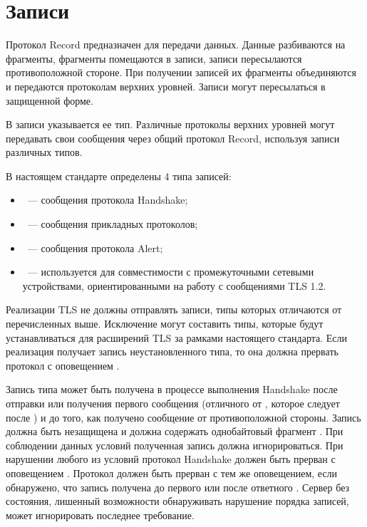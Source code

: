 \section{Записи}\label{RECORD.Rec}

Протокол Record предназначен для передачи данных. Данные разбиваются на 
фрагменты, фрагменты помещаются в записи, записи пересылаются противоположной 
стороне. При получении записей их фрагменты объединяются и передаются 
протоколам верхних уровней. Записи могут пересылаться в защищенной форме.

В записи указывается ее тип. Различные протоколы верхних уровней могут 
передавать свои сообщения через общий протокол Record, используя записи 
различных типов.

В настоящем стандарте определены 4 типа записей:
\begin{itemize}
\item
{}~--- сообщения протокола Handshake;
\item
{}~--- сообщения прикладных протоколов;
\item
{}~--- сообщения протокола Alert;
\item
{}~--- используется для совместимости с промежуточными 
сетевыми устройствами, ориентированными на работу с сообщениями TLS 1.2.
\end{itemize}

Реализации TLS не должны отправлять записи, типы которых отличаются от
перечисленных выше. Исключение могут составить типы, которые будут
устанавливаться для расширений TLS за рамками настоящего стандарта. Если
реализация получает запись неустановленного типа, то она должна прервать
протокол с оповещением .

Запись типа  может быть получена в процессе выполнения
Handshake после отправки или получения первого сообщения
 (отличного от , которое
следует после ) и до того, как получено
сообщение  от противоположной стороны.
%
Запись должна быть незащищена и должна содержать однобайтовый фрагмент 
.
%
%
При соблюдении данных условий полученная запись должна игнорироваться.
%
При нарушении любого из условий протокол Handshake должен быть прерван с 
оповещением .
%
Протокол должен быть прерван с тем же оповещением, если обнаружено, 
что запись  получена до первого 
 или после ответного .
%
Сервер без состояния, лишенный возможности обнаруживать нарушение 
порядка записей, может игнорировать последнее требование.

